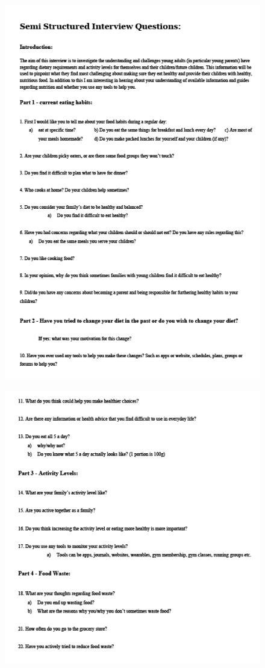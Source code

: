     \begin{figure}[H]
        \centering
        \includegraphics[scale=0.8]{figures/Interviewguide2.png}
    \end{figure}
    \begin{figure}[H]
        \centering
        \includegraphics[scale=0.8]{figures/Interviewguide3.png}
    \end{figure}

